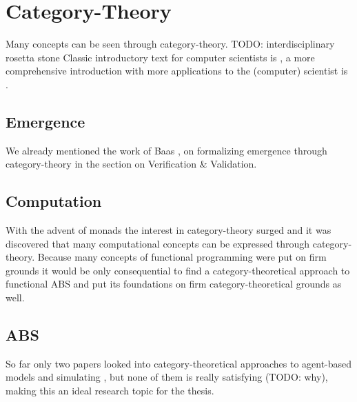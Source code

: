 \section{Category-Theory}
Many concepts can be seen through category-theory. TODO: interdisciplinary rosetta stone 
Classic introductory text for computer scientists is \cite{pierce_basic_1991}, a more comprehensive introduction with more applications to the (computer) scientist is \cite{spivak_category_2014}.

\subsection{Emergence}
We already mentioned the work of Baas \cite{baas_emergence_1994}, \cite{baas_emergence_1997} on formalizing emergence through category-theory in the section on Verification \& Validation.

\subsection{Computation}
With the advent of monads the interest in category-theory surged and it was discovered that many computational concepts can be expressed through category-theory. Because many concepts of functional programming were put on firm grounds it would be only consequential to find a category-theoretical approach to functional ABS and put its foundations on firm category-theoretical grounds as well. 

\subsection{ABS}
So far only two papers looked into category-theoretical approaches to agent-based models and simulating \cite{beheshti_analyzing_2013}, \cite{lloyd_category-theoretic_2010} but none of them is really satisfying (TODO: why), making this an ideal research topic for the thesis.